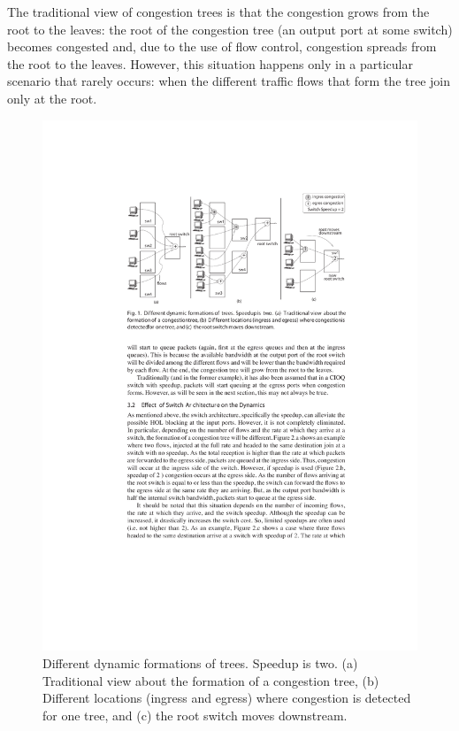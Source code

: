 \documentclass[12pt]{article}
\begin{document}
The traditional view of congestion trees is that the congestion grows from the root to the leaves: the root of the congestion tree (an output port at some switch) becomes congested and, due to the use of flow control, congestion spreads from the root to the leaves. However, this situation happens only in a particular scenario that rarely occurs: when the different traffic flows that form the tree join only at the root.

\begin{figure}[ht]
	\centering
		\includegraphics{congestion_dynamics.pdf}
		\caption{Different dynamic formations of trees. Speedup is two. (a) Traditional view about the formation of a congestion tree, (b) Different locations (ingress and egress) where congestion is detected for one tree, and (c) the root switch moves downstream.}
		\label{fig:congestion_dynamics}
\end{figure}
\end{document}
